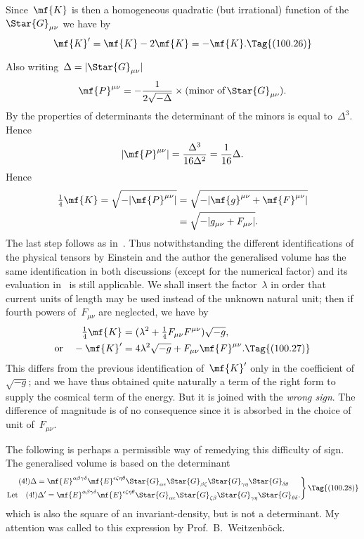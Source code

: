 \documentclass[12pt]{book}
\begin{document}
Since~$\mf{K}$ is then a homogeneous quadratic (but irrational) function of the~$\Star{G}_{\mu\nu}$ we have
by~
\[
\mf{K}' = \mf{K} - 2\mf{K} = -\mf{K}.
\Tag{(100.26)}
\]

Also writing~$\Delta=|\Star{G}_{\mu\nu}|$
\[
\mf{P}^{\mu\nu}=-\frac{1}{2\sqrt{-\Delta}}\times(\text{minor of}\,\Star{G}_{\mu\nu}).
\]
By the properties of determinants the determinant of the minors is equal to~$\Delta^3$.
Hence
\[
|\mf{P}^{\mu\nu}| = \frac{\Delta^3}{16\Delta^2} = \frac{1}{16}\Delta.
\]
Hence
\begin{align*}
\tfrac{1}{4}\mf{K} = \sqrt{-|\mf{P}^{\mu\nu}|} & = \sqrt{-|\mf{g}^{\mu\nu} + \mf{F}^{\mu\nu}|}\\
                                               & = \sqrt{-|g_{\mu\nu} + F_{\mu\nu}|}.
\end{align*}
The last step follows as in~.
Thus notwithstanding the different identifications of the physical tensors by Einstein and the author the generalised
volume has the same identification in both discussions (except for the numerical factor) and its evaluation
in~ is still applicable.
We shall insert the factor~$\lambda$ in order that current units of length may be used instead of the unknown natural
unit; then if fourth powers of~$F_{\mu\nu}$ are neglected, we have by~
\begin{align*}
\tfrac{1}{4}\mf{K} & = (\lambda^2 + \tfrac{1}{4}F_{\mu\nu}F^{\mu\nu})\sqrt{-g},\\
\text{or}\quad -\mf{K}' & = 4\lambda^2\sqrt{-g} + F_{\mu\nu}\mf{F}^{\mu\nu}.
\Tag{(100.27)}
\end{align*}
This differs from the previous identification of~$\mf{K}'$ only in the coefficient of~$\sqrt{-g}$;
and we have thus obtained quite naturally a term of the right form to supply the cosmical term of the energy.
But it is joined with the \emph{wrong sign}\footnotemark.\footnotetext
       {The difference of magnitude is of no consequence since it is absorbed in the choice of unit of~$F_{\mu\nu}$.}

The following is perhaps a permissible way of remedying this difficulty of sign.
The generalised volume is based on the determinant
\begin{multline*}
\left.
\begin{gathered}
(4!)\Delta = \mf{E}^{\alpha\beta\gamma\delta} \mf{E}^{\epsilon\zeta\eta\theta}
                  \Star{G}_{\alpha\epsilon} \Star{G}_{\beta\zeta} \Star{G}_{\gamma\eta} \Star{G}_{\delta\theta}\\
\text{Let}\quad (4!)\Delta' = \mf{E}^{\alpha\beta\gamma\delta} \mf{E}^{\epsilon\zeta\eta\theta}
                  \Star{G}_{\alpha\epsilon} \Star{G}_{\zeta\beta} \Star{G}_{\gamma\eta} \Star{G}_{\theta\delta}.
\end{gathered}
\right\}
\Tag{(100.28)}
\end{multline*}
which is also the square of an invariant\hyp{}density, but is not a determinant\footnotemark.\footnotetext
    {My attention was called to this expression by Prof.~B.~Weitzenb\"ock.}
\end{document}
